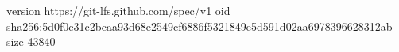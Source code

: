 version https://git-lfs.github.com/spec/v1
oid sha256:5d0f0c31c2bcaa93d68e2549cf6886f5321849e5d591d02aa6978396628312ab
size 43840
